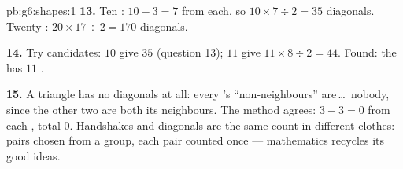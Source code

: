 \begin{solution}{pb:g6:shapes:1}
\textbf{13.} Ten : $10 - 3 = 7$ from each, so
$10 \times 7 \div 2 = 35$ diagonals. Twenty :
$20 \times 17 \div 2 = 170$ diagonals.

\textbf{14.} Try candidates: $10$  give $35$ (question
13); $11$  give $11 \times 8 \div 2 = 44$. Found: the
 has $11$ .

\textbf{15.} A triangle has no diagonals at all: every 's
``non-neighbours'' are\,\dots\ nobody, since the other two
 are both its neighbours. The method agrees:
$3 - 3 = 0$ from each , total $0$. Handshakes and
diagonals are the same count in different clothes: pairs chosen
from a group, each pair counted once --- mathematics recycles
its good ideas.
\end{solution}

